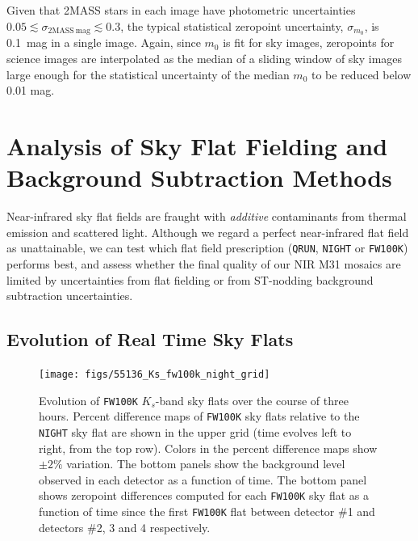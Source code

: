 \documentclass[iop]{emulateapj}
\begin{document}
Given that 2MASS stars in each image have photometric uncertainties $0.05 \lesssim \sigma_{\mathrm{2MASS~mag}} \lesssim 0.3$, the typical statistical zeropoint uncertainty, $\sigma_{m_0}$, is 0.1~mag in a single image.
Again, since $m_0$ is fit for sky images, zeropoints for science images are interpolated as the median of a sliding window of sky images large enough for the statistical uncertainty of the median $m_0$ to be reduced below 0.01 mag.

\section{Analysis of Sky Flat Fielding and Background Subtraction Methods}
\label{sec:flatanalysis}

Near-infrared sky flat fields are fraught with \emph{additive} contaminants from thermal emission and scattered light.
Although we regard a perfect near-infrared flat field as unattainable, we can test which flat field prescription (\texttt{QRUN}, \texttt{NIGHT} or \texttt{FW100K}) performs best, and assess whether the final quality of our NIR M31 mosaics are limited by uncertainties from flat fielding or from ST-nodding background subtraction uncertainties.


\subsection{Evolution of Real Time Sky Flats}
\label{sec:flatevo}

\begin{figure}[t]
\centering
\texttt{[image: figs/55136\_Ks\_fw100k\_night\_grid]}
\caption{
Evolution of \texttt{FW100K} $K_s$-band sky flats over the course of three hours.
Percent difference maps of \texttt{FW100K} sky flats relative to the \texttt{NIGHT} sky flat are shown in the upper grid (time evolves left to right, from the top row).
Colors in the percent difference maps show $\pm2\%$ variation.
The bottom panels show the background level observed in each detector as a function of time.
The bottom panel shows zeropoint differences computed for each \texttt{FW100K} sky flat as a function of time since the first \texttt{FW100K} flat between detector \#1 and detectors \#2, 3 and 4 respectively.
}
\label{fig:fw100k_movie}
\end{figure}
\end{document}
